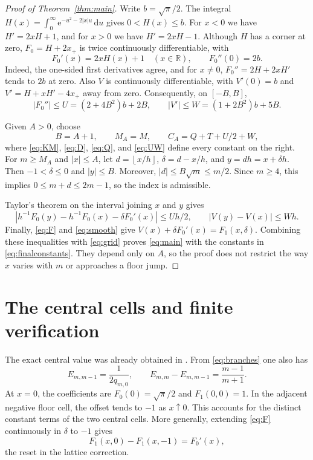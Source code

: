 \documentclass[11pt]{amsart}
\newcommand{\ee}{\mathrm e}
\newcommand{\dd}{\,\mathrm d}
\begin{document}
\begin{proof}[Proof of Theorem~\ref{thm:main}]
Write $b=\sqrt\pi/2$. The integral
$H(x)=\int_0^\infty\ee^{-u^2-2|x|u}\dd u$ gives $0<H(x)\le b$.
For $x<0$ we have $H'=2xH+1$, and for $x>0$ we have
$H'=2xH-1$. Although $H$ has a corner at zero, $F_0=H+2x_+$
is twice continuously differentiable, with
\begin{equation}\label{eq:smooth}
 F_0'(x)=2xH(x)+1\quad(x\in\mathbb R),\qquad F_0''(0)=2b.
\end{equation}
Indeed, the one-sided first derivatives agree, and for $x\ne0$,
$F_0''=2H+2xH'$ tends to $2b$ at zero. Also $V$ is continuously
differentiable, with $V'(0)=b$ and $V'=H+xH'-4x_+$ away from zero.
Consequently, on $[-B,B]$,
\begin{equation}\label{eq:UW}
 |F_0''|\le U=(2+4B^2)b+2B,\qquad
 |V'|\le W=(1+2B^2)b+5B.
\end{equation}

Given $A>0$, choose
\begin{equation}\label{eq:finalconstants}
 B=A+1,\qquad M_A=M,\qquad C_A=Q+T+U/2+W,
\end{equation}
where \eqref{eq:KM}, \eqref{eq:D}, \eqref{eq:Q}, and \eqref{eq:UW}
define every constant on the right.
For $m\ge M_A$ and $|x|\le A$, let
$d=\left\lfloor x/h\right\rfloor$, $\delta=d-x/h$, and $y=dh=x+\delta h$.
Then $-1<\delta\le0$ and $|y|\le B$. Moreover,
$|d|\le B\sqrt m\le m/2$. Since $m\ge4$, this implies
$0\le m+d\le2m-1$, so the index is admissible.

Taylor's theorem on the interval joining $x$ and $y$ gives
\[
 \left|h^{-1}F_0(y)-h^{-1}F_0(x)-\delta F_0'(x)\right|\le Uh/2,
 \qquad |V(y)-V(x)|\le Wh.
\]
Finally, \eqref{eq:F} and \eqref{eq:smooth} give
$V(x)+\delta F_0'(x)=F_1(x,\delta)$. Combining these inequalities
with \eqref{eq:grid} proves \eqref{eq:main} with the constants in
\eqref{eq:finalconstants}. They depend only on $A$, so the proof
does not restrict the way $x$ varies with $m$ or approaches a floor jump.
\end{proof}

\section{The central cells and finite verification}

The exact central value was already obtained in
\cite[Corollary 7.2]{IJS2026}. From \eqref{eq:branches} one also has
\begin{equation}\label{eq:central}
 E_{m,m-1}=\frac{1}{2q_{m,0}},\qquad
 E_{m,m}-E_{m,m-1}=\frac{m-1}{m+1}.
\end{equation}
At $x=0$, the coefficients are $F_0(0)=\sqrt\pi/2$ and $F_1(0,0)=1$.
In the adjacent negative floor cell, the offset tends to $-1$ as
$x\uparrow0$. This accounts for the distinct constant terms of the two
central cells. More generally, extending \eqref{eq:F} continuously in
$\delta$ to $-1$ gives
\[
 F_1(x,0)-F_1(x,-1)=F_0'(x),
\]
the reset in the lattice correction.
\end{document}
